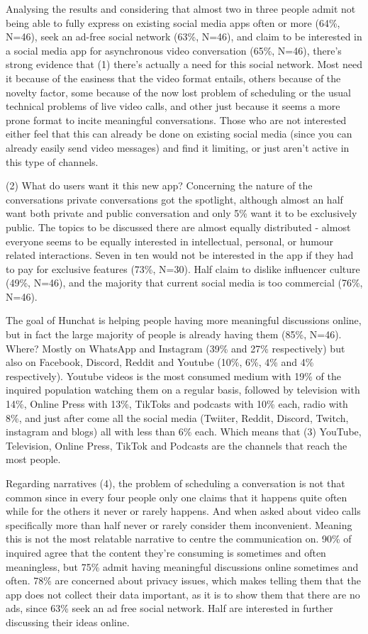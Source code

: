 \documentclass[12pt]{article}
\begin{document}
Analysing the results and considering that almost two in three people admit not being able to fully express on existing social media apps often or more (64\%, N=46), seek an ad-free social network (63\%, N=46), and claim to be interested in a social media app for asynchronous video conversation (65\%, N=46), there's strong evidence that (1) there's actually a need for this social network. Most need it because of the easiness that the video format entails, others because of the novelty factor, some because of the now lost problem of scheduling or the usual technical problems of live video calls, and other just because it seems a more prone format to incite meaningful conversations. Those who are not interested either feel that this can already be done on existing social media (since you can already easily send video messages) and find it limiting, or just aren't active in this type of channels.

(2) What do users want it this new app? Concerning the nature of the conversations private conversations got the spotlight, although almost an half want both private and public conversation and only 5\% want it to be exclusively public. The topics to be discussed there are almost equally distributed - almost everyone seems to be equally interested in intellectual, personal, or humour related interactions. Seven in ten would not be interested in the app if they had to pay for exclusive features (73\%, N=30). Half claim to dislike influencer culture (49\%, N=46), and the majority that current social media is too commercial (76\%, N=46).

The goal of Hunchat is helping people having more meaningful discussions online, but in fact the large majority of people is already having them (85\%, N=46). Where? Mostly on WhatsApp and Instagram (39\% and 27\% respectively) but also on Facebook, Discord, Reddit and Youtube (10\%, 6\%, 4\% and 4\% respectively). Youtube videos is the most consumed medium with 19\% of the inquired population watching them on a regular basis, followed by television with 14\%, Online Press with 13\%, TikToks and podcasts with 10\% each, radio with 8\%, and just after come all the social media (Twiiter, Reddit, Discord, Twitch, instagram and blogs) all with less than 6\% each. Which means that (3) YouTube, Television, Online Press, TikTok and Podcasts are the channels that reach the most people.

Regarding narratives (4), the problem of scheduling a conversation is not that common since in every four people only one claims that it happens quite often while for the others it never or rarely happens. And when asked about video calls specifically more than half never or rarely consider them inconvenient. Meaning this is not the most relatable narrative to centre the communication on. 90\% of inquired agree that the content they're consuming is sometimes and often meaningless, but 75\% admit having meaningful discussions online sometimes and often. 78\% are concerned about privacy issues, which makes telling them that the app does not collect their data important, as it is to show them that there are no ads, since 63\% seek an ad free social network. Half are interested in further discussing their ideas online. 
\end{document}
